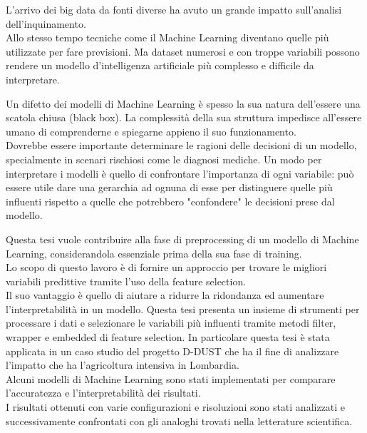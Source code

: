 L'arrivo dei big data da fonti diverse ha avuto un grande impatto sull'analisi dell'inquinamento.\\
Allo stesso tempo tecniche come il Machine Learning diventano quelle più utilizzate per fare previsioni.
Ma dataset numerosi e con troppe variabili possono rendere un modello d'intelligenza artificiale più complesso e difficile da interpretare.\par
Un difetto dei modelli di Machine Learning è spesso la sua natura dell'essere una scatola chiusa (black box). La complessità della sua struttura impedisce all'essere umano di comprenderne e spiegarne appieno il suo funzionamento.\\
Dovrebbe essere importante determinare le ragioni delle decisioni di un modello, specialmente in scenari rischiosi come le diagnosi mediche.
Un modo per interpretare i modelli è quello di confrontare l'importanza di ogni variabile: può essere utile dare una gerarchia ad ognuna di esse per distinguere quelle più influenti rispetto a quelle che potrebbero "confondere" le decisioni prese dal modello. \par
Questa tesi vuole contribuire alla fase di preprocessing di un modello di Machine Learning, considerandola essenziale prima della sua fase di training.\\
Lo scopo di questo lavoro è di fornire un approccio per trovare le migliori variabili predittive tramite l'uso della feature selection. \\
Il suo vantaggio è quello di aiutare a ridurre la ridondanza ed aumentare l'interpretabilità in un modello.
Questa tesi presenta un insieme di strumenti per processare i dati e selezionare le variabili più influenti tramite metodi filter, wrapper e embedded di feature selection.
In particolare questa tesi è stata applicata in un caso studio del progetto D-DUST che ha il fine di analizzare l'impatto che ha l'agricoltura intensiva in Lombardia.\\ 
Alcuni modelli di Machine Learning sono stati implementati per comparare l'accuratezza e l'interpretabilità dei risultati.\\
I risultati ottenuti con varie configurazioni e risoluzioni sono stati analizzati e successivamente confrontati con gli analoghi trovati nella letterature scientifica.
\\
